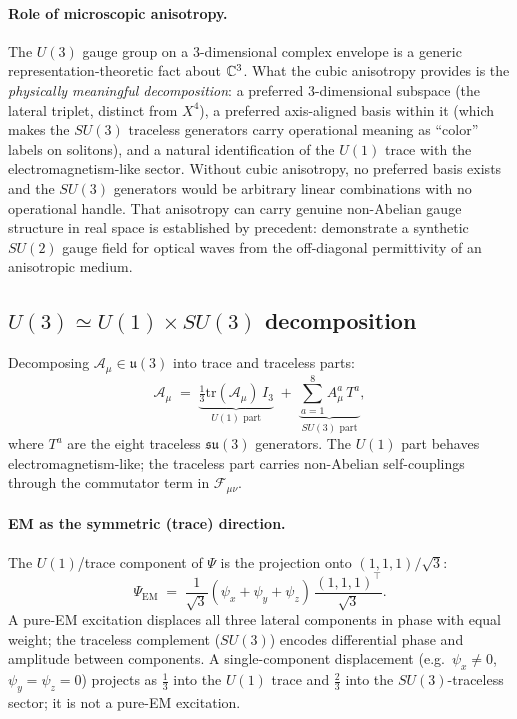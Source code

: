 \paragraph{Role of microscopic anisotropy.}
The $U(3)$ gauge group on a 3-dimensional complex envelope is a generic representation-theoretic
fact about $\mathbb{C}^3$.
What the cubic anisotropy provides is the \emph{physically meaningful decomposition}: a preferred
3-dimensional subspace (the lateral triplet, distinct from $X^4$), a preferred axis-aligned basis
within it (which makes the $SU(3)$ traceless generators carry operational meaning as ``color'' labels
on solitons), and a natural identification of the $U(1)$ trace with the electromagnetism-like sector.
Without cubic anisotropy, no preferred basis exists and the $SU(3)$ generators would be arbitrary
linear combinations with no operational handle.
That anisotropy can carry genuine non-Abelian gauge structure in real space is established by
precedent: \citet{Chen2019NonAbelianOptics} demonstrate a synthetic $SU(2)$ gauge field for optical
waves from the off-diagonal permittivity of an anisotropic medium.

\subsection{\texorpdfstring{$U(3) \simeq U(1)\times SU(3)$ decomposition}{U(3) = U(1) x SU(3) decomposition}}
\label{subsec:u3-decomp}

Decomposing $\mathcal{A}_\mu\in\mathfrak{u}(3)$ into trace and traceless parts:
\begin{equation}
  \mathcal{A}_\mu
  \;=\;
  \underbrace{\tfrac{1}{3}\mathrm{tr}(\mathcal{A}_\mu)\,I_3}_{U(1)\text{ part}}
  \;+\;
  \underbrace{\sum_{a=1}^{8}A^a_\mu\,T^a}_{SU(3)\text{ part}},
  \label{eq:u3-decomp}
\end{equation}
where $T^a$ are the eight traceless $\mathfrak{su}(3)$ generators.
The $U(1)$ part behaves electromagnetism-like; the traceless part carries non-Abelian self-couplings
through the commutator term in $\mathcal{F}_{\mu\nu}$.

\paragraph{EM as the symmetric (trace) direction.}
The $U(1)$/trace component of $\Psi$ is the projection onto $(1,1,1)/\sqrt{3}$:
\begin{equation}
  \Psi_{\mathrm{EM}} \;=\;
  \frac{1}{\sqrt{3}}(\psi_x+\psi_y+\psi_z)\,\frac{(1,1,1)^\top}{\sqrt{3}}.
  \label{eq:em-trace}
\end{equation}
A pure-EM excitation displaces all three lateral components in phase with equal weight; the traceless
complement ($SU(3)$) encodes differential phase and amplitude between components.
A single-component displacement (e.g.\ $\psi_x\neq 0$, $\psi_y=\psi_z=0$) projects as $\tfrac13$
into the $U(1)$ trace and $\tfrac23$ into the $SU(3)$-traceless sector; it is not a pure-EM
excitation.

